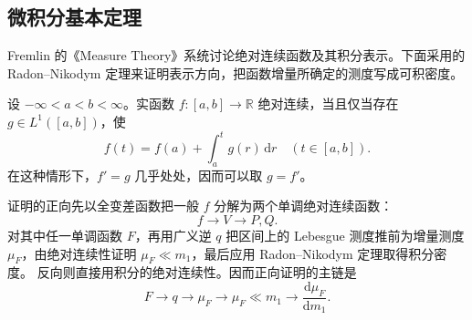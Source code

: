 \subsection{微积分基本定理}
\label{b1:subsec:160402}

Fremlin 的《Measure Theory》\cite[225B--E]{Fremlin2016Measure}系统讨论绝对连续函数及其积分表示。下面采用的 Radon--Nikodym 定理来证明表示方向，把函数增量所确定的测度写成可积密度。

\begin{theorem}
\label{b1:thm:ac-fundamental-calculus}
设 \(-\infty<a<b<\infty\)。实函数 \(f:[a,b]\to\mathbb R\) 绝对连续，当且仅当存在 \(g\in L^1([a,b])\)，使
\[
f(t)=f(a)+\int_a^t g(r)\,\mathrm dr
\quad(t\in[a,b]).
\]
在这种情形下，\(f'=g\) 几乎处处，因而可以取 \(g=f'\)。
\end{theorem}
证明的正向先以全变差函数把一般 \(f\) 分解为两个单调绝对连续函数：
\[
 f\longrightarrow V\longrightarrow P,Q.
\]
对其中任一单调函数 \(F\)，再用广义逆 \(q\) 把区间上的 Lebesgue 测度推前为增量测度
\(\mu_F\)，由绝对连续性证明 \(\mu_F\ll m_1\)，最后应用 Radon--Nikodym 定理取得积分密度。
反向则直接用积分的绝对连续性。因而正向证明的主链是
\[
 F\longrightarrow q\longrightarrow\mu_F
 \longrightarrow\mu_F\ll m_1
 \longrightarrow\frac{\mathrm d\mu_F}{\mathrm dm_1}.
\]
